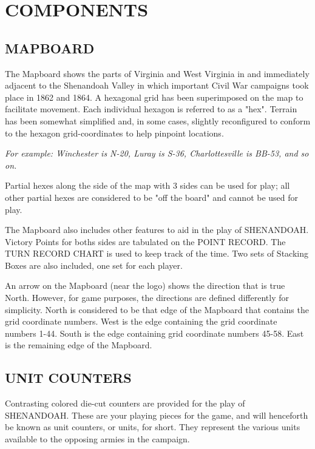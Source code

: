 \section{COMPONENTS}

\subsection{MAPBOARD}

The Mapboard shows the parts of Virginia and West Virginia in and immediately adjacent to the Shenandoah Valley in which important Civil War campaigns took place in 1862 and 1864. A hexagonal grid has been superimposed on the map to facilitate movement. Each individual hexagon is referred to as a "hex". Terrain has been somewhat simplified and, in some cases, slightly reconfigured to conform to the hexagon grid-coordinates to help pinpoint locations.

\textit{For example: Winchester is N-20, Luray is S-36, Charlottesville is BB-53, and so on.}

Partial hexes along the side of the map with 3 sides can be used for play; all other partial hexes are considered to be "off the board" and cannot be used for play.

The Mapboard also includes other features to aid in the play of SHENANDOAH. Victory Points for boths sides are tabulated on the POINT RECORD. The TURN RECORD CHART is used to keep track of the time. Two sets of Stacking Boxes are also included, one set for each player.

An arrow on the Mapboard (near the logo) shows the direction that is true North. However, for game purposes, the directions are defined differently for simplicity. North is considered to be that edge of the Mapboard that contains the grid coordinate numbers. West is the edge containing the grid coordinate numbers 1-44. South is the edge containing grid coordinate numbers 45-58. East is the remaining edge of the Mapboard.

\subsection{UNIT COUNTERS}

Contrasting colored die-cut counters are provided for the play of SHENANDOAH. These are your playing pieces for the game, and will henceforth be known as unit counters, or units, for short. They represent the various units available to the opposing armies in the campaign.

